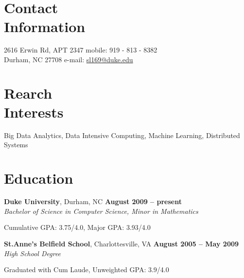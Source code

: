\documentclass[11pt,margin,line]{cv}
\begin{document}
\begin{resume}

    \section{\mysidestyle Contact\\Information}
    2616 Erwin Rd, APT 2347                   \hfill mobile: 919 - 813 - 8382               \vspace{1mm}\\\vspace{0mm}%
    Durham, NC 27708          \hfill e-mail: \href{mailto:sl169@duke.edu}{sl169@duke.edu} \vspace{1mm}\\\vspace{-4.5mm}%
    \section{\mysidestyle Rearch\\Interests}
    Big Data Analytics, Data Intensive Computing, Machine Learning, Distributed Systems\vspace{1mm}

    \section{\mysidestyle Education}
    \textbf{Duke University}, Durham, NC \hfill \textbf{August 2009 -- present}\vspace{1mm}\\\vspace{0mm}%
    \textsl{Bachelor of Science in Computer Science, Minor in Mathematics}
    \vspace{-2mm}\\\vspace{-1mm}%
    \begin{list3}
        \item Cumulative GPA: 3.75/4.0, Major GPA: 3.93/4.0
    \end{list3}
    \textbf{St.Anne's Belfield School}, Charlottesville, VA \hfill \textbf{August 2005 -- May 2009}\vspace{1mm}\\\vspace{0mm}%
    \textsl{High School Degree}
    \vspace{-2mm}\\\vspace{-1mm}%
    \begin{list3}
        \item Graduated with Cum Laude, Unweighted GPA: 3.9/4.0
    \end{list3}


\end{resume}
\end{document}
